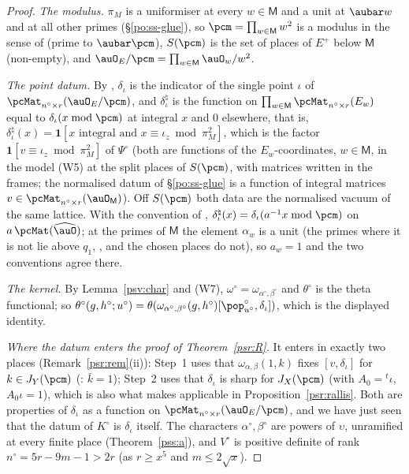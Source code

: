 \documentclass[10pt]{amsart}
\theoremstyle{definition}
\theoremstyle{remark}
\begin{document}
\begin{proof}
\emph{The modulus.} $\pi_M$ is a uniformiser at every $w\in\mathsf M$ and a unit at $\aubar w$ and at all other
primes (\S\ref{po:ss-glue}), so $\pcm=\prod_{w\in\mathsf M}w^2$ is a modulus in the sense of {\cite[\S2.3]{P53}}
(prime to $\aubar\pcm$), $S(\pcm)$ is the set of places of $E^+$ below $\mathsf M$ (non-empty), and
$\auO_E/\pcm=\prod_{w\in\mathsf M}\auO_w/w^2$.

\emph{The point datum.} By {\cite[\S2.3]{P53}}, $\delta_\iota$ is the indicator of the single point $\iota$ of
$\pcMat_{n^\circ\times r}(\auO_E/\pcm)$, and $\delta_\iota^\natural$ is the function on $\prod_{w\in\mathsf M}
\pcMat_{n^\circ\times r}(E_w)$ equal to $\delta_\iota(x\bmod\pcm)$ at integral $x$ and $0$ elsewhere, that is,
$\delta_\iota^\natural(x)=\mathbf 1[x\text{ integral and }x\equiv\iota_z\bmod\pi_M^2]$, which is the factor
$\mathbf 1[v\equiv\iota_z\bmod\pi_M^2]$ of $\Psi^\circ$ (both are functions of the $E_w$-coordinates, $w\in\mathsf M$,
in the model (W5) at the split places of $S(\pcm)$, with matrices written in the frames; the normalised
datum of \S\ref{po:ss-glue} is a function of integral matrices $v\in\pcMat_{n^\circ\times r}(\auO_{\mathsf M})$). Off
$S(\pcm)$ both data are the normalised vacuum of the same lattice. With the convention of
{\cite[Definition~6.31]{P53}}, $\delta_\iota^\natural(x)=\delta_\iota(a^{-1}x\bmod\pcm)$ on $a\,\pcMat(\widehat\auO)$; at the
primes of $\mathsf M$ the element $\alpha_w$ is a unit (the primes where it is not lie above $q_1$,
{\cite[Proposition~6.9(a)]{P53}}, and the chosen places do not), so $a_w=1$ and the two conventions agree there.

\emph{The kernel.} By Lemma~\ref{psv:char} and (W7), $\omega^\circ=\omega_{\alpha^\circ,\beta^\circ}$ and $\theta^\circ$
is the theta functional; so $\theta^\circ(g,h^\circ;u^\circ)=\theta(\omega_{\alpha^\circ,\beta^\circ}(g,h^\circ)[\pop^\circ_{u^\circ},
\delta_\iota])$, which is the displayed identity.

\emph{Where the datum enters the proof of Theorem~\ref{psr:R}.} It enters in exactly two places
(Remark~\ref{psr:rem}(ii)): Step~1 uses that $\omega_{\alpha,\beta}(1,k)$ fixes $[v,\delta_\iota]$ for $k\in J_Y(\pcm)$
({\cite[Lemma~2.9]{P53}}: $\bar k=1$); Step~2 uses that $\delta_\iota$ is sharp for $J_X(\pcm)$ (with $A_0={}^t\iota$,
$A_0\iota=1$), which is also what makes {\cite[Lemma~2.14]{P53}} applicable in Proposition~\ref{psr:rallis}. Both
are properties of $\delta_\iota$ as a function on $\pcMat_{n^\circ\times r}(\auO_E/\pcm)$, and we have just seen that
the datum of $K^\circ$ is $\delta_\iota$ itself. The characters $\alpha^\circ,\beta^\circ$ are powers of $\upsilon$, unramified at
every finite place (Theorem~\ref{pss:a}), and $V^\circ$ is positive definite of rank $n^\circ=5r-9m-1>2r$ (as
$r\ge x^5$ and $m\le2\sqrt x$).
\end{proof}
\end{document}
